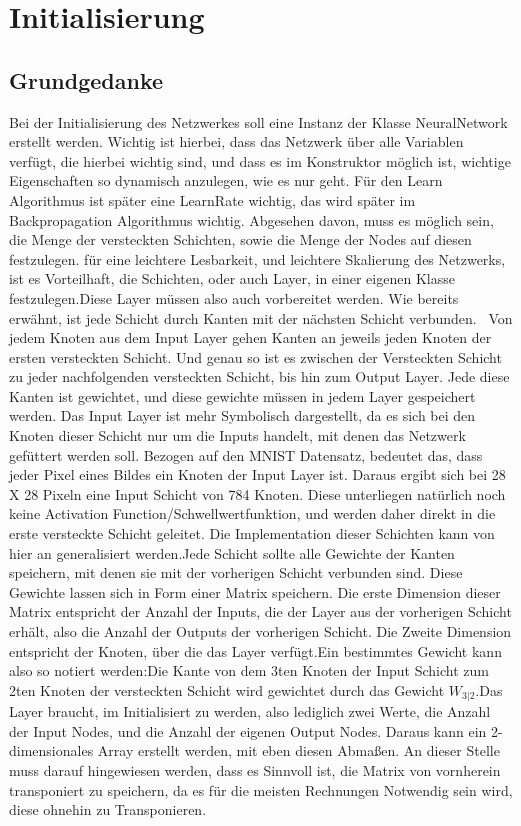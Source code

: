 \documentclass[12pt]{article}
\begin{document}
\section{ Initialisierung}
\subsection{ Grundgedanke}Bei der Initialisierung des Netzwerkes soll eine Instanz der Klasse NeuralNetwork erstellt werden. Wichtig ist hierbei, dass das Netzwerk über alle Variablen verfügt, die hierbei wichtig sind, und dass es im Konstruktor möglich ist, wichtige Eigenschaften so dynamisch anzulegen, wie es nur geht. Für den Learn Algorithmus ist später eine LearnRate wichtig, das wird später im Backpropagation Algorithmus wichtig. Abgesehen davon, muss es möglich sein, die Menge der versteckten Schichten, sowie die Menge der Nodes auf diesen festzulegen. für eine leichtere Lesbarkeit, und leichtere Skalierung des Netzwerks, ist es Vorteilhaft, die Schichten, oder auch Layer, in einer eigenen Klasse festzulegen.Diese Layer müssen also auch vorbereitet werden. Wie bereits erwähnt, ist jede Schicht durch Kanten mit der nächsten Schicht verbunden.  Von jedem Knoten aus dem Input Layer gehen Kanten an jeweils jeden Knoten der ersten versteckten Schicht. Und genau so ist es zwischen der Versteckten Schicht zu jeder nachfolgenden versteckten Schicht, bis hin zum Output Layer. Jede diese Kanten ist gewichtet, und diese gewichte müssen in jedem Layer gespeichert werden. Das Input Layer ist mehr Symbolisch dargestellt, da es sich bei den Knoten dieser Schicht nur um die Inputs handelt, mit denen das Netzwerk gefüttert werden soll. Bezogen auf den MNIST Datensatz, bedeutet das, dass jeder Pixel eines Bildes ein Knoten der Input Layer ist. Daraus ergibt sich bei 28 X 28 Pixeln eine Input Schicht von 784 Knoten. Diese unterliegen natürlich noch keine Activation Function/Schwellwertfunktion, und werden daher direkt in die erste versteckte Schicht geleitet. Die Implementation dieser Schichten kann von hier an generalisiert werden.Jede Schicht sollte alle Gewichte der Kanten speichern, mit denen sie mit der vorherigen Schicht verbunden sind. Diese Gewichte lassen sich in Form einer Matrix speichern. Die erste Dimension dieser Matrix entspricht der Anzahl der Inputs, die der Layer aus der vorherigen Schicht erhält, also die Anzahl der Outputs der vorherigen Schicht. Die Zweite Dimension entspricht der Knoten, über die das Layer verfügt.Ein bestimmtes Gewicht kann also so notiert werden:Die Kante von dem 3ten Knoten der Input Schicht zum 2ten Knoten der versteckten Schicht wird gewichtet durch das Gewicht $W_{3|2}$.Das Layer braucht, im Initialisiert zu werden, also lediglich zwei Werte, die Anzahl der Input Nodes, und die Anzahl der eigenen Output Nodes. Daraus kann ein 2-dimensionales Array erstellt werden, mit eben diesen Abmaßen. An dieser Stelle muss darauf hingewiesen werden, dass es Sinnvoll ist, die Matrix von vornherein transponiert zu speichern, da es für die meisten Rechnungen Notwendig sein wird, diese ohnehin zu Transponieren.
\end{document}
